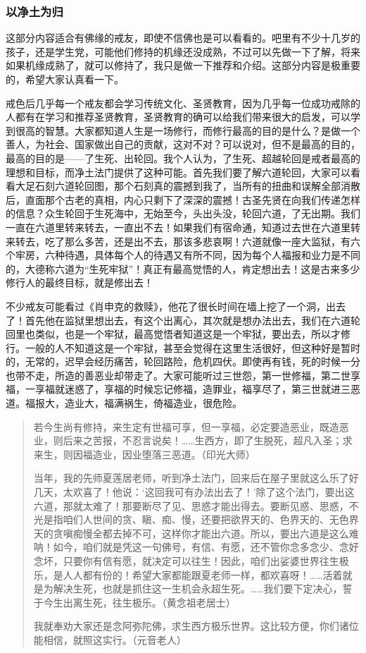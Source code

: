 \subsubsection{以净土为归}

这部分内容适合有佛缘的戒友，即使不信佛也是可以看看的。吧里有不少十几岁的孩子，还是学生党，可能他们修持的机缘还没成熟，不过可以先做一下了解，将来如果机缘成熟了，就可以修持了，我只是做一下推荐和介绍。这部分内容是极重要的，希望大家认真看一下。

戒色后几乎每一个戒友都会学习传统文化、圣贤教育，因为几乎每一位成功戒除的人都有在学习和推荐圣贤教育，圣贤教育的确可以给我们带来很大的启发，可以学到很高的智慧。大家都知道人生是一场修行，而修行最高的目的是什么？是做一个善人，为社会、国家做出自己的贡献，这对不对？可以说对，但不是最高的目的，最高的目的是——了生死、出轮回。我个人认为，了生死、超越轮回是戒者最高的理想和目标，而净土法门提供了这种可能。首先我们要了解六道轮回，大家可以看看大足石刻六道轮回图，那个石刻真的震撼到我了，当所有的扭曲和误解全部消散后，直面那个古老的真相，内心只剩下了深深的震撼！古圣先贤在向我们传递怎样的信息？众生轮回于生死海中，无始至今，头出头没，轮回六道，了无出期。我们一直在六道里转来转去，一直出不去！如果我们有宿命通，知道过去世在六道里转来转去，吃了那么多苦，还是出不去，那该多悲哀啊！六道就像一座大监狱，有六个牢房，六种待遇，具体每个人的待遇又有所不同，因为每个人福报和业力是不同的，大德称六道为“生死牢狱”！真正有最高觉悟的人，肯定想出去！这是古来多少修行人的最终目标，就是修出去！

不少戒友可能看过《肖申克的救赎》，他花了很长时间在墙上挖了一个洞，出去了！首先他在监狱里想出去，有这个出离心，其次就是想办法出去，我们在六道轮回里也类似，也是一个牢狱，最高觉悟者知道这是一个牢狱，要出去，所以才修行。一般的人不知道这是一个牢狱，甚至会觉得在这里生活很好，但这种好是暂时的，无常的，迟早会经历痛苦，轮回路险，危机四伏。即使再有钱，死的时候一分也带不走，所造的善恶业却带走了。大家可能听过三世怨，第一世修福，第二世享福，一享福就迷惑了，享福的时候忘记修福，造罪业，福享尽了，第三世就进三恶道。福报大，造业大，福满祸生，倚福造业，很危险。

\begin{quotation}
    若今生尚有修持，来生定有世福可享，但一享福，必定要造恶业，既造恶业，则后来之苦报，不忍言说矣！……生西方，即了生脱死，超凡入圣；求来生，则因福造业，因业堕落三恶道。（印光大师）

    当年，我的先师夏莲居老师，听到净土法门，回来后在屋子里就这么乐了好几天，太欢喜了！他说：‘这回我可有办法出去了！’除了这个法门，要出这六道，那就太难了！那要断尽了见、思惑才能出得去。要断见惑、思惑，不光是指咱们人世间的贪、瞋、痴、慢，还要把欲界天的、色界天的、无色界天的贪嗔痴慢全都去掉不可，这样你才能出六道。所以，要出六道是这么难呐！如今，咱们就是凭这一句佛号，有信、有愿，还不管你念多念少、念好念坏，只要你有信有愿，就决定可以往生！因此，咱们出娑婆世界往生极乐，是人人都有份的！希望大家都能跟夏老师一样，都欢喜呀！……活着就是为解决生死，也就是抓住这一生机会永超生死。……我们要下定决心，誓于今生出离生死，往生极乐。（黄念祖老居士）

    我就奉劝大家还是念阿弥陀佛，求生西方极乐世界。这比较方便，你们诸位能相信，就照这实行。（元音老人）
\end{quotation}

